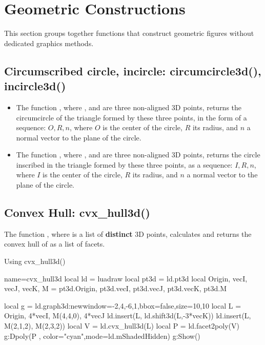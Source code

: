 \section{Geometric Constructions}

This section groups together functions that construct geometric figures without dedicated graphics methods.

\subsection{Circumscribed circle, incircle: circumcircle3d(), incircle3d()}

\begin{itemize}
    \item The function , where ,  and  are three non-aligned 3D points, returns the circumcircle of the triangle formed by these three points, in the form of a sequence: $O,R,n$, where $O$ is the center of the circle, $R$ its radius, and $n$ a normal vector to the plane of the circle.
     \item The function , where ,  and  are three non-aligned 3D points, returns the circle inscribed in the triangle formed by these three points, as a sequence: $I,R,n$, where $I$ is the center of the circle, $R$ its radius, and $n$ a normal vector to the plane of the circle.
\end{itemize}

\subsection{Convex Hull: cvx\_hull3d()}

The function , where  is a list of \textbf{distinct} 3D points, calculates and returns the convex hull of  as a list of facets.

\begin{demo}{Using cvx\_hull3d()}
\begin{luadraw}{name=cvx_hull3d}
local ld = luadraw
local pt3d = ld.pt3d
local Origin, vecI, vecJ, vecK, M = pt3d.Origin, pt3d.vecI, pt3d.vecJ, pt3d.vecK, pt3d.M

local g = ld.graph3d:new{window={-2,4,-6,1},bbox=false,size={10,10}}
local L = {Origin, 4*vecI, M(4,4,0), 4*vecJ}
ld.insert(L, ld.shift3d(L,-3*vecK))
ld.insert(L, {M(2,1,2), M(2,3,2)})
local V = ld.cvx_hull3d(L)
local P = ld.facet2poly(V)
g:Dpoly(P , {color="cyan",mode=ld.mShadedHidden})
g:Show()
\end{luadraw}
\end{demo}


